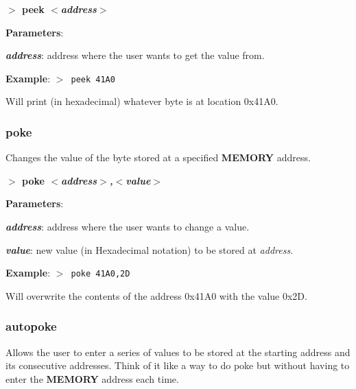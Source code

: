 \documentclass[a4paper,11pt]{article}
\begin{document}
        \hspace{1.9cm}\textbf{$>$ peek \textit{$<$address$>$}}

        \textbf{Parameters}:

        \hspace{1cm}\textbf{\textit{address}}: address where the user wants
        to get the value from.

        \textbf{Example}: \texttt{$>$ peek 41A0}

        Will print (in hexadecimal) whatever byte is at location 0x41A0.

        \subsubsection{{\color{blue}poke}}
        Changes the value of the byte stored at a specified \textbf{MEMORY}
        address.

        \hspace{1.9cm}\textbf{$>$ poke \textit{$<$address$>$,$<$value$>$}}

        \textbf{Parameters}:

        \hspace{1cm}\textbf{\textit{address}}: address where the user wants
        to change a value.
        
        \hspace{1cm}\textbf{\textit{value}}: new value (in Hexadecimal notation)
        to be stored at \textit{address}.

        \textbf{Example}: \texttt{$>$ poke 41A0,2D}

        Will overwrite the contents of the address 0x41A0 with the value
        0x2D.

        \subsubsection{{\color{blue}autopoke}}
        Allows the user to enter a series of values to be stored at the
        starting address and its consecutive addresses. Think of it like a
        way to do poke but without having to enter the \textbf{MEMORY}
        address each time.
\end{document}
